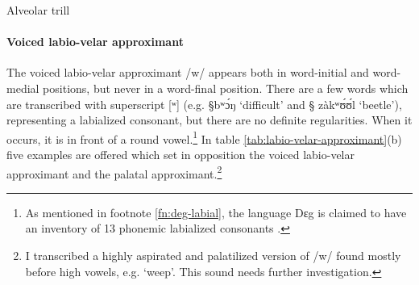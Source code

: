 \begin{table}[htb]
\centering
\caption{Alveolar trill\label{tab:alveolar-trill}}
\quad
{}


\end{table}




\paragraph{Voiced labio-velar approximant}
\label{par:labio-velar-approximant}
The voiced labio-velar approximant /w/ appears both in word-initial and
word-medial positions, but never in a word-final position.  There are a few
words
which are transcribed with superscript [ʷ] (e.g. {\S  bʷɔ́ŋ} `difficult' and
{\S
zàkʷʊ́ʊ́l} `beetle'),  representing a labialized consonant, but there
are  no definite regularities. When it  occurs, it is in front of a
round vowel.\footnote{As mentioned in footnote \ref{fn:deg-labial}, the language
Dɛg is claimed to have an inventory of 13 phonemic labialized consonants
\cite[2]{Crou03}. } In table \ref{tab:labio-velar-approximant}(b)  five
examples are offered which set in opposition the voiced labio-velar approximant
and the
palatal approximant.\footnote{I transcribed {\K
[wʲ]}  a highly aspirated and palatilized
version of /w/ found mostly before high vowels, e.g. {\K
[wʲìì]} `weep'. This sound needs  further investigation.}



